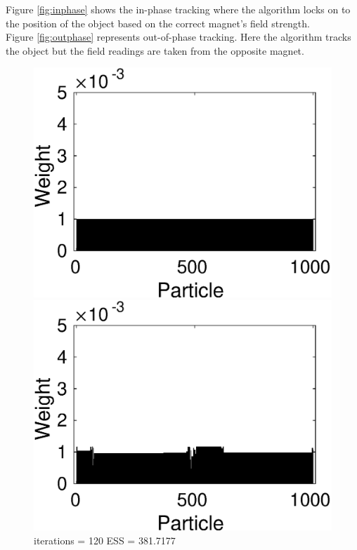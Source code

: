 \documentclass[12pt]{article}
\begin{document}
Figure \ref{fig:inphase} shows the in-phase tracking where the algorithm locks on to the position of the object based on the correct magnet's field strength.\\
Figure \ref{fig:outphase} represents out-of-phase tracking. Here the algorithm tracks the object but the field readings are taken from the opposite magnet. 
\newpage
\begin{figure}[h!]
\centering
	\begin{minipage}{0.5\textwidth}
		\centering
		\includegraphics[scale = 0.5]{./Figures/120resampled.eps}
		\caption*{iterations = 120 ESS = 381.7177}
	\end{minipage}%
	\begin{minipage}{0.5\textwidth}
		\centering
		\includegraphics[scale = 0.5]{./Figures/121.eps}

\end{minipage}
\end{figure}
\end{document}
